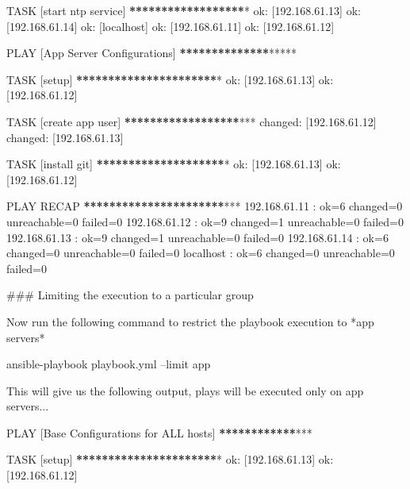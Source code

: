 TASK [start ntp service] \textbf{**}\textbf{**}\textbf{**}\textbf{**}\textbf{**}\textbf{**}\textbf{**}\textbf{**}\textbf{**}*
ok: [192.168.61.13]
ok: [192.168.61.14]
ok: [localhost]
ok: [192.168.61.11]
ok: [192.168.61.12]

PLAY [App Server Configurations] \textbf{**}\textbf{**}\textbf{**}\textbf{**}\textbf{**}\textbf{**}\textbf{**}*****

TASK [setup] \textbf{**}\textbf{**}\textbf{**}\textbf{**}\textbf{**}\textbf{**}\textbf{**}\textbf{**}\textbf{**}\textbf{**}\textbf{**}*
ok: [192.168.61.13]
ok: [192.168.61.12]

TASK [create app user] \textbf{**}\textbf{**}\textbf{**}\textbf{**}\textbf{**}\textbf{**}\textbf{**}\textbf{**}\textbf{**}***
changed: [192.168.61.12]
changed: [192.168.61.13]

TASK [install git] \textbf{**}\textbf{**}\textbf{**}\textbf{**}\textbf{**}\textbf{**}\textbf{**}\textbf{**}\textbf{**}\textbf{**}*
ok: [192.168.61.13]
ok: [192.168.61.12]

PLAY RECAP \textbf{**}\textbf{**}\textbf{**}\textbf{**}\textbf{**}\textbf{**}\textbf{**}\textbf{**}\textbf{**}\textbf{**}\textbf{**}***
192.168.61.11              : ok=6    changed=0    unreachable=0    failed=0
192.168.61.12              : ok=9    changed=1    unreachable=0    failed=0
192.168.61.13              : ok=9    changed=1    unreachable=0    failed=0
192.168.61.14              : ok=6    changed=0    unreachable=0    failed=0
localhost                  : ok=6    changed=0    unreachable=0    failed=0
\begin{code}

### Limiting the execution to a particular group  

Now run the following command to restrict the playbook execution to *app servers*  

\end{code}
ansible-playbook playbook.yml --limit app

\begin{code}

This will give us the following output, plays will be executed only on app servers...  


\end{code}
PLAY [Base Configurations for ALL hosts] \textbf{**}\textbf{**}\textbf{**}\textbf{**}\textbf{**}\textbf{**}***

TASK [setup] \textbf{**}\textbf{**}\textbf{**}\textbf{**}\textbf{**}\textbf{**}\textbf{**}\textbf{**}\textbf{**}\textbf{**}\textbf{**}*
ok: [192.168.61.13]
ok: [192.168.61.12]

